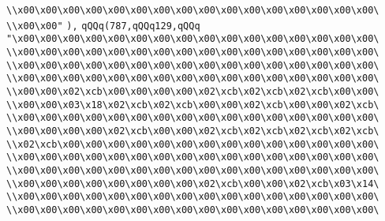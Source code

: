 \verb|\\x00\x00\x00\x00\x00\x00\x00\x00\x00\x00\x00\x00\x00\x00\x00\x00\|\newline
\verb|\\x00\x00"|\newline
\verb|),|\newline
\verb|qQQq(787,qQQq129,qQQq|\newline
\verb|"\x00\x00\x00\x00\x00\x00\x00\x00\x00\x00\x00\x00\x00\x00\x00\x00\|\newline
\verb|\\x00\x00\x00\x00\x00\x00\x00\x00\x00\x00\x00\x00\x00\x00\x00\x00\|\newline
\verb|\\x00\x00\x00\x00\x00\x00\x00\x00\x00\x00\x00\x00\x00\x00\x00\x00\|\newline
\verb|\\x00\x00\x00\x00\x00\x00\x00\x00\x00\x00\x00\x00\x00\x00\x00\x00\|\newline
\verb|\\x00\x00\x02\xcb\x00\x00\x00\x00\x02\xcb\x02\xcb\x02\xcb\x00\x00\|\newline
\verb|\\x00\x00\x03\x18\x02\xcb\x02\xcb\x00\x00\x02\xcb\x00\x00\x02\xcb\|\newline
\verb|\\x00\x00\x00\x00\x00\x00\x00\x00\x00\x00\x00\x00\x00\x00\x00\x00\|\newline
\verb|\\x00\x00\x00\x00\x02\xcb\x00\x00\x02\xcb\x02\xcb\x02\xcb\x02\xcb\|\newline
\verb|\\x02\xcb\x00\x00\x00\x00\x00\x00\x00\x00\x00\x00\x00\x00\x00\x00\|\newline
\verb|\\x00\x00\x00\x00\x00\x00\x00\x00\x00\x00\x00\x00\x00\x00\x00\x00\|\newline
\verb|\\x00\x00\x00\x00\x00\x00\x00\x00\x00\x00\x00\x00\x00\x00\x00\x00\|\newline
\verb|\\x00\x00\x00\x00\x00\x00\x00\x00\x02\xcb\x00\x00\x02\xcb\x03\x14\|\newline
\verb|\\x00\x00\x00\x00\x00\x00\x00\x00\x00\x00\x00\x00\x00\x00\x00\x00\|\newline
\verb|\\x00\x00\x00\x00\x00\x00\x00\x00\x00\x00\x00\x00\x00\x00\x00\x00\|\newline
